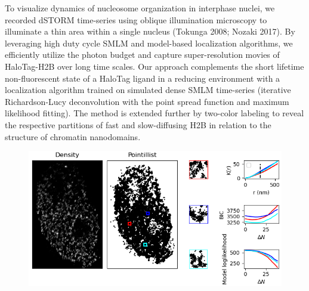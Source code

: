 \documentclass{ucetd}
\begin{document}
To visualize dynamics of nucleosome organization in interphase nuclei, we recorded dSTORM time-series using oblique illumination microscopy to illuminate a thin area within a single nucleus (Tokunga 2008; Nozaki 2017). By leveraging high duty cycle SMLM and model-based localization algorithms, we efficiently utilize the photon budget and capture super-resolution movies of HaloTag-H2B over long time scales. Our approach complements the short lifetime non-fluorescent state of a HaloTag ligand in a reducing environment with a localization algorithm trained on simulated dense SMLM time-series (iterative Richardson-Lucy deconvolution with the point spread function and maximum likelihood fitting). The method is extended further by two-color labeling to reveal the respective partitions of fast and slow-diffusing H2B in relation to the structure of chromatin nanodomains.  


\begin{figure}
\begin{center}
\includegraphics[width=16cm]{Cluster.png}
\end{center}
\end{figure}
\end{document}
